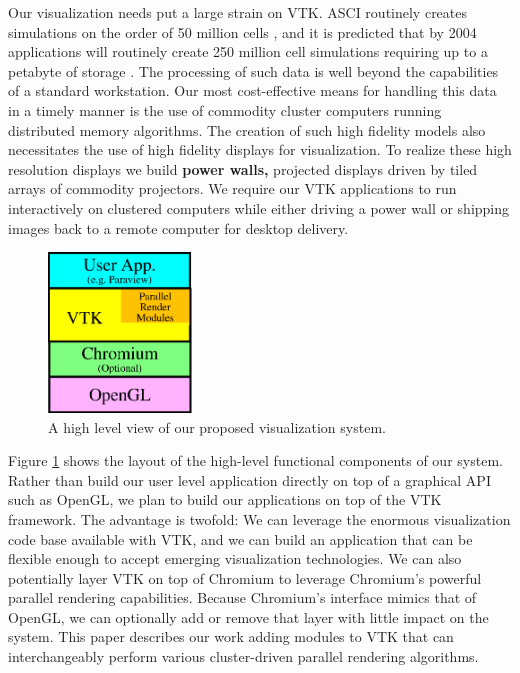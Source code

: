 \documentclass{acmsiggraph}
\newcommand{\keyterm}[1]{\textbf{#1}}
\begin{document}
  Our visualization needs put a large strain on VTK.  ASCI routinely
  creates simulations on the order of 50 million cells \cite{Heermann99},
  and it is predicted that by 2004 applications will routinely create 250
  million cell simulations requiring up to a petabyte of storage
  \cite{Smith98}.  The processing of such data is well beyond the
  capabilities of a standard workstation.  Our most cost-effective means
  for handling this data in a timely manner is the use of commodity cluster
  computers running distributed memory algorithms.  The creation of such
  high fidelity models also necessitates the use of high fidelity displays
  for visualization.  To realize these high resolution displays we build
  \keyterm{power walls,} projected displays driven by tiled arrays of
  commodity projectors.  We require our VTK applications to run
  interactively on clustered computers while either driving a power wall or
  shipping images back to a remote computer for desktop delivery.

  \begin{figure}
    \center
    \includegraphics[width=1.5in]{images/AppLayers}
    \caption{A high level view of our proposed visualization system.}
    \label{fig:applayers}
  \end{figure}
  Figure \ref{fig:applayers} shows the layout of the high-level functional
  components of our system.  Rather than build our user level application
  directly on top of a graphical API such as OpenGL, we plan to build our
  applications on top of the VTK framework.  The advantage is twofold: We
  can leverage the enormous visualization code base available with VTK, and
  we can build an application that can be flexible enough to accept
  emerging visualization technologies.  We can also potentially layer VTK
  on top of Chromium to leverage Chromium's powerful parallel rendering
  capabilities.  Because Chromium's interface mimics that of OpenGL, we can
  optionally add or remove that layer with little impact on the system.
  This paper describes our work adding modules to VTK that can
  interchangeably perform various cluster-driven parallel rendering
  algorithms.
\end{document}
